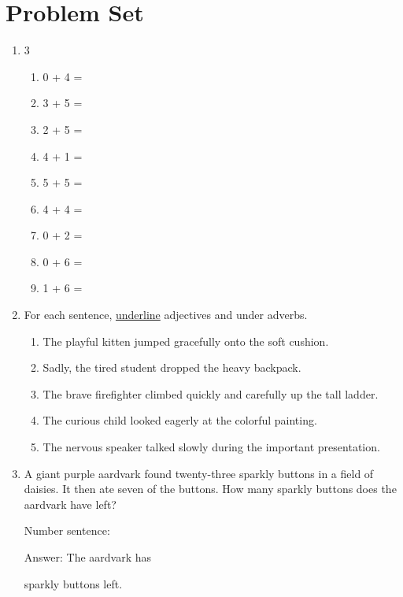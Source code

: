 \documentclass{tufte-book}
\begin{document}
\clearpage\section{Problem Set }

\begin{enumerate}
  \item
  \begin{multicols}{3}
    \begin{enumerate}\bigskip
      \item 0 + 4 = \dotfill\bigskip
      \item 3 + 5 = \dotfill\bigskip
      \item 2 + 5 = \dotfill
      \item 4 + 1 = \dotfill\bigskip
      \item 5 + 5 = \dotfill\bigskip
      \item 4 + 4 = \dotfill
      \item 0 + 2 = \dotfill\bigskip
      \item 0 + 6 = \dotfill\bigskip
      \item 1 + 6 = \dotfill
    \end{enumerate}
  \end{multicols}

  \item For each sentence, \underline{underline} adjectives and  under adverbs.
  \begin{enumerate}
    \item The playful kitten jumped gracefully onto the soft cushion.
    \item Sadly, the tired student dropped the heavy backpack.
    \item The brave firefighter climbed quickly and carefully up the tall ladder.
    \item The curious child looked eagerly at the colorful painting.
    \item The nervous speaker talked slowly during the important presentation.
  \end{enumerate}

  \item A giant purple aardvark found twenty-three sparkly buttons in a field of daisies. It then ate seven of the buttons. How many sparkly buttons does the aardvark have left?\medskip\par
  Number sentence: \dotfill\medskip\par
  Answer: The aardvark has 
  \dotfill\medskip\par\mbox{}\dotfill\medskip\par\mbox{}\dotfill\bigskip
    sparkly buttons left.
\end{enumerate}
\end{document}
